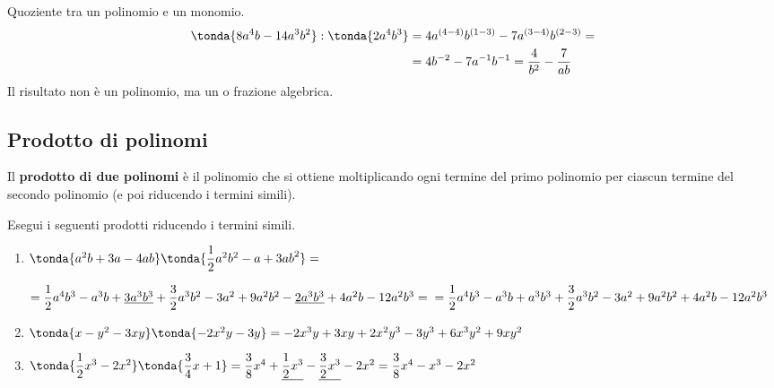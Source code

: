 \begin{esempio}{}{}
Quoziente tra un polinomio e un monomio.
\begin{align*}
\tonda{8a^{4}b-14a^{3}b^{2}}:\tonda{2a^{4}b^3} &= 
4a^{(4-4)}b^{(1-3)}-7a^{(3-4)}b^{(2-3)} = \\
& = 4b^{-2}-7a^{-1}b^{-1} = \frac{4}{b^2}-\frac{7}{ab}
\end{align*}
Il risultato non è un polinomio, ma un 
 o frazione algebrica.
\end{esempio}


\subsection{Prodotto di polinomi}
\label{subsec:poli_prodotto}

\begin{definizione}{}{}
Il \textbf{prodotto di due polinomi} è il
polinomio che si 
ottiene moltiplicando ogni termine del primo polinomio per ciascun 
termine del secondo polinomio 
(e poi riducendo i termini simili).
\end{definizione}

\begin{esempio}{}{}
 Esegui i seguenti prodotti riducendo i termini simili.

\begin{enumerate} [left=0mm]
\item 
\(\tonda{a^{2}b+3a-4{ab}}\tonda{\dfrac{1}{2}a^{2}b^{2}-a+3{ab}^{2}}=\)

\(=\dfrac{1}{2}a^{4}b^{3}-a^{3}b+\underline{3a^{3}b^{3}}+
   \dfrac{3}{2}a^{3}b^{2}
-3a^{2}+9a^{2}b^{2} -\underline{2a^{3}b^{3}}+4a^{2}b-12a^{2}b^{3}=\newline
=\dfrac{1}{2}a^{4}b^{3}-a^{3}b+a^{3}b^{3}+
 \dfrac{3}{2}a^{3}b^{2}-3a^{2}+9a^{2}b^{2}+4a^{2}b-12a^{2}b^{3}\)
\item 
\(\tonda{x-y^{2}-3{xy}}\tonda{-2x^{2}y-3y}=-2x^{3}y+3{xy}+2x^{2}y^
{3}-3y^{3}+6x^{3}y^{2}+9{xy}^{2}\)
\item 
\(\tonda{\dfrac{1}{2}x^{3}-2x^{2}}\tonda{\dfrac{3}{4}x+1}=
\dfrac{3}{8}x^{4}+\underline{\dfrac{1}{2}x^{3}}-
 \underline{\dfrac{3}{2}x^{3}}-2x^{2}
=\dfrac{3}{8}x^{4}-x^{3}-2x^{2}\)
\end{enumerate}
\end{esempio}

